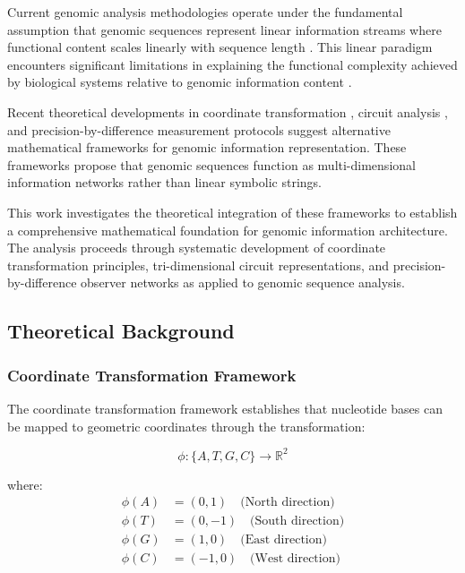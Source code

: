 \documentclass[12pt,a4paper]{article}
\begin{document}
Current genomic analysis methodologies operate under the fundamental assumption that genomic sequences represent linear information streams where functional content scales linearly with sequence length \cite{watson1953molecular, venter2001sequence}. This linear paradigm encounters significant limitations in explaining the functional complexity achieved by biological systems relative to genomic information content \cite{encode2012integrated}.

Recent theoretical developments in coordinate transformation \cite{sachikonye2024sequence}, circuit analysis \cite{sachikonye2024circuits}, and precision-by-difference measurement protocols \cite{sachikonye2024precision} suggest alternative mathematical frameworks for genomic information representation. These frameworks propose that genomic sequences function as multi-dimensional information networks rather than linear symbolic strings.

This work investigates the theoretical integration of these frameworks to establish a comprehensive mathematical foundation for genomic information architecture. The analysis proceeds through systematic development of coordinate transformation principles, tri-dimensional circuit representations, and precision-by-difference observer networks as applied to genomic sequence analysis.

\subsection{Theoretical Background}

\subsubsection{Coordinate Transformation Framework}

The coordinate transformation framework \cite{sachikonye2024sequence} establishes that nucleotide bases can be mapped to geometric coordinates through the transformation:

\begin{equation}
\phi: \{A, T, G, C\} \rightarrow \mathbb{R}^2
\end{equation}

where:
\begin{align}
\phi(A) &= (0, 1) \quad \text{(North direction)} \\
\phi(T) &= (0, -1) \quad \text{(South direction)} \\
\phi(G) &= (1, 0) \quad \text{(East direction)} \\
\phi(C) &= (-1, 0) \quad \text{(West direction)}
\end{align}
\end{document}
